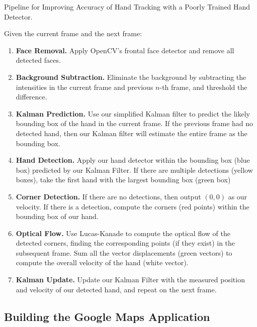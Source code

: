 \documentclass[12pt]{article}
\begin{document}
\begin{algorithm}
\caption{Pipeline for Improving Accuracy of Hand Tracking with a Poorly Trained Hand Detector.}
\label{pipeline}

\noindent Given the current frame and the next frame:
\begin{enumerate}
\item {\bf Face Removal.} Apply OpenCV's frontal face detector and remove all detected faces.
\item {\bf Background Subtraction.} Eliminate the background by subtracting the intensities in the current frame and previous $n$-th frame, and threshold the difference.
\item {\bf Kalman Prediction.} Use our simplified Kalman filter to predict the likely bounding box of the hand in the current frame. If the previous frame had no detected hand, then our Kalman filter will estimate the entire frame as the bounding box.
\item {\bf Hand Detection.} Apply our hand detector within the bounding box (blue box) predicted by our Kalman Filter. If there are multiple detections (yellow boxes), take the first hand with the largest bounding box (green box)
\item {\bf Corner Detection.} If there are no detections, then output $(0,0)$ as our velocity. If there is a detection, compute the corners (red points) within the bounding box of our hand.
\item {\bf Optical Flow.} Use Lucas-Kanade to compute the optical flow of the detected corners, finding the corresponding points (if they exist) in the subsequent frame. Sum all the vector displacements (green vectors) to compute the overall velocity of the hand (white vector).
\item {\bf Kalman Update.} Update our Kalman Filter with the measured position and velocity of our detected hand, and repeat on the next frame.
\end{enumerate}
\end{algorithm}

\subsection{Building the Google Maps Application}
\end{document}
